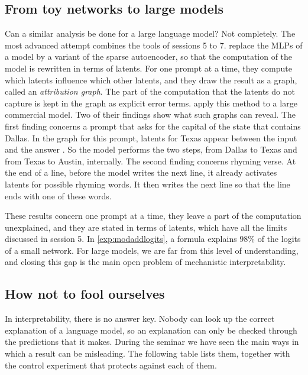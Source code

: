 \subsection{From toy networks to large models}

Can a similar analysis be done for a large language model? Not completely. The most advanced attempt combines
the tools of sessions 5 to 7. \citet{ameisen2025circuit} replace the MLPs of a model by a variant of the sparse
autoencoder, so that the computation of the model is rewritten in terms of latents. For one prompt at a time, they
compute which latents influence which other latents, and they draw the result as a graph, called an
\emph{attribution graph}. The part of the computation that the latents do not capture is kept in the graph as
explicit error terms. \citet{lindsey2025biology} apply this method to a large commercial model. Two of their
findings show what such graphs can reveal. The first finding concerns a prompt that asks for the capital of the
state that contains Dallas. In the graph for this prompt, latents for Texas appear between the input and the answer
. So the model performs the two steps, from Dallas to Texas and from Texas to Austin, internally. The
second finding concerns rhyming verse. At the end of a line, before the model writes the next line, it already
activates latents for possible rhyming words. It then writes the next line so that the line ends with one of these
words.

These results concern one prompt at a time, they leave a part of the computation unexplained, and they are
stated in terms of latents, which have all the limits discussed in session 5. In \cref{exp:modaddlogits}, a formula
explains $98\%$ of the logits of a small network. For large models, we are far from this level of understanding, and
closing this gap is the main open problem of mechanistic interpretability.

\subsection{How not to fool ourselves}
\label{sec:pitfalls}

In interpretability, there is no answer key. Nobody can look up the correct explanation of a language model, so
an explanation can only be checked through the predictions that it makes. During the seminar we have seen the main
ways in which a result can be misleading. The following table lists them, together with the control experiment that
protects against each of them.

